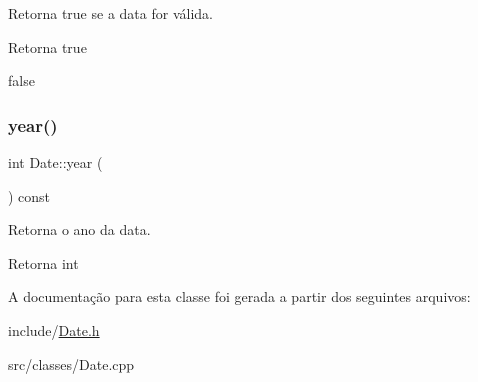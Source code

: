 Retorna true se a data for válida. 

\begin{DoxyReturn}{Retorna}
true 

false 
\end{DoxyReturn}
\mbox{\label{classDate_adb59de8d1ac3b04cbd57be3b551be2dc}} 
\subsubsection{\texorpdfstring{year()}{year()}}
{\footnotesize\ttfamily int Date\+::year (\begin{DoxyParamCaption}{ }\end{DoxyParamCaption}) const}



Retorna o ano da data. 

\begin{DoxyReturn}{Retorna}
int 
\end{DoxyReturn}


A documentação para esta classe foi gerada a partir dos seguintes arquivos\+:\begin{DoxyCompactItemize}
\item 
include/\hyperlink{Date_8h}{Date.\+h}\item 
src/classes/Date.\+cpp\end{DoxyCompactItemize}
